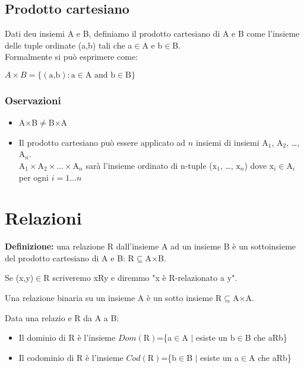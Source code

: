 \documentclass{book}
\begin{document}
    \subsection{Prodotto cartesiano}
    Dati deu insiemi A e B, definiamo il prodotto cartesiano di A e B come l'insieme delle tuple ordinate (a,b) tali che a$\in$A e b$\in$B.\\
    Formalmente si può esprimere come:
    \begin{center}
        $A \times B=\{(\text{a,b}) : \text{a} \in \text{A and b} \in \text{B}\}$
    \end{center}

    \subsubsection{Oservazioni}
    \begin{itemize}
        \item A$\times$B$\neq$B$\times$A
        \item Il prodotto cartesiano può essere applicato ad $n$ insiemi di insiemi $\text{A}_1$, $\text{A}_2$, \dots , $\text{A}_n$.\\
        $\text{A}_1 \times \text{A}_2 \times \dots \times \text{A}_n$ sarà l'insieme ordinato di n-tuple ($\text{x}_1$, \dots , $\text{x}_n$) dove $\text{x}_i \in \text{A}_i$ per ogni $i=1 \dots n$
    \end{itemize}

    \section{Relazioni}
    \textbf{Definizione:} una relazione R dall'insieme A ad un insieme B è un sottoinsieme del prodotto cartesiano di A e B: R$\subseteq$A$\times$B.


    Se (x,y)$\in$R scriveremo xRy e diremmo "x è R-relazionato a y".


    Una relazione binaria su un insieme A è un sotto insieme R$\subseteq$A$\times$A.
    \vspace{4ex}

    \noindent
    Data una relazio e R da A a B:
    \begin{itemize}
        \item Il dominio di R è l'insieme $Dom(\text{R})$=\{a$\in$A $|$ esiste un b$\in$B che aRb\}
        \item Il codominio di R è l'insieme $Cod(\text{R})$=\{b$\in$B $|$ esiste un a$\in$A che aRb\}
    \end{itemize}
\end{document}
